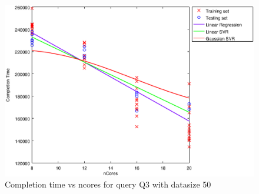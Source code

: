 
\begin {figure}[hbtp]
\centering
\includegraphics[width=\textwidth]{output/Q3_50_ALL_FEATURES/plot_Q3_50_bestmodels.eps}
\caption{Completion time vs ncores for query Q3 with datasize 50}
\label{fig:all_linear_Q3_50}
\end {figure}
